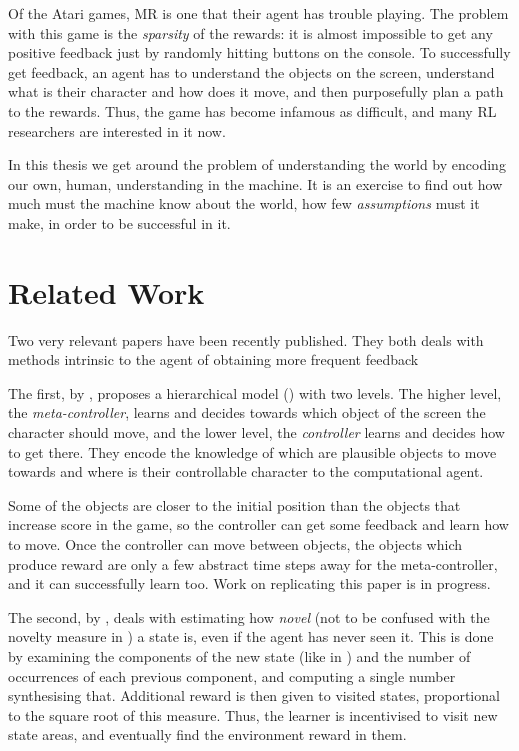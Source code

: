 Of the Atari games, \acl{MR} is one that their agent has trouble playing. The
problem with this game is the \emph{sparsity} of the rewards: it is almost
impossible to get any positive feedback just by randomly hitting buttons on the
console. To successfully get feedback, an agent has to understand the objects on
the screen, understand what is their character and how does it move, and then
purposefully plan a path to the rewards. Thus, the game has become infamous as
difficult, and many \ac{RL} researchers are interested in it now.

In this thesis we get around the problem of understanding the world by encoding
our own, human, understanding in the machine. It is an exercise to find out how
much must the machine know about the world, how few \emph{assumptions} must it
make, in order to be successful in it.

\section{Related Work}
Two very relevant papers have been recently published. They both deals with
methods intrinsic to the agent of obtaining more frequent feedback

The first, by
\citet{kulkarni2016hierarchical}, proposes a hierarchical model
() with two levels. The higher level, the
\emph{meta-controller}, learns and decides towards which object of the screen
the character should move, and the lower level, the \emph{controller} learns and
decides how to get there. They encode the knowledge of which are plausible
objects to move towards and where is their controllable character to the
computational agent.

Some of the objects are closer to the initial position than the objects that
increase score in the game, so the controller can get some feedback and learn
how to move. Once the controller can move between objects, the objects which
produce reward are only a few abstract time steps away for the meta-controller,
and it can successfully learn too. Work on replicating this paper is in
progress.

The second, by \citet{bellemare2016unifying}, deals with estimating how
\emph{novel} (not to be confused with the novelty measure in
) a state is, even if the agent has never seen
it. This is done by examining the components of the new state (like in
) and the number of occurrences of each previous
component, and computing a single number synthesising that. Additional reward is
then given to visited states, proportional to the square root of this measure.
Thus, the learner is incentivised to visit new state areas, and eventually find
the environment reward in them.


